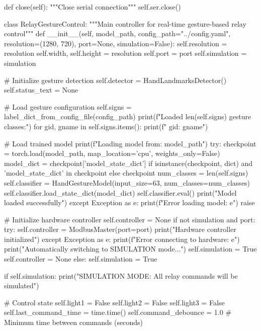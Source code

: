 \begin{aivncodebox}
\begin{python}
    def close(self):
        """Close serial connection"""
        self.ser.close()

class RelayGestureControl:
    """Main controller for real-time gesture-based relay control"""
    def __init__(self, model_path, config_path="../config.yaml", 
                 resolution=(1280, 720), port=None, simulation=False):
        self.resolution = resolution
        self.width, self.height = resolution
        self.port = port
        self.simulation = simulation
        
        # Initialize gesture detection
        self.detector = HandLandmarksDetector()
        self.status_text = None
        
        # Load gesture configuration
        self.signs = label_dict_from_config_file(config_path)
        print(f"Loaded {len(self.signs)} gesture classes:")
        for gid, gname in self.signs.items():
            print(f"  {gid}: {gname}")
        
        # Load trained model
        print(f"Loading model from: {model_path}")
        try:
            checkpoint = torch.load(model_path, map_location='cpu', weights_only=False)
            model_dict = checkpoint['model_state_dict'] if isinstance(checkpoint, dict) and 'model_state_dict' in checkpoint else checkpoint
            num_classes = len(self.signs)
            self.classifier = HandGestureModel(input_size=63, num_classes=num_classes)
            self.classifier.load_state_dict(model_dict)
            self.classifier.eval()
            print("Model loaded successfully")
        except Exception as e:
            print(f"Error loading model: {e}")
            raise
        
        # Initialize hardware controller
        self.controller = None
        if not simulation and port:
            try:
                self.controller = ModbusMaster(port=port)
                print("Hardware controller initialized")
            except Exception as e:
                print(f"Error connecting to hardware: {e}")
                print("Automatically switching to SIMULATION mode...")
                self.simulation = True
                self.controller = None
        else:
            self.simulation = True
        
        if self.simulation:
            print("SIMULATION MODE: All relay commands will be simulated")
        
        # Control state
        self.light1 = False
        self.light2 = False
        self.light3 = False
        self.last_command_time = time.time()
        self.command_debounce = 1.0  # Minimum time between commands (seconds)
        

\end{python}
\end{aivncodebox}
